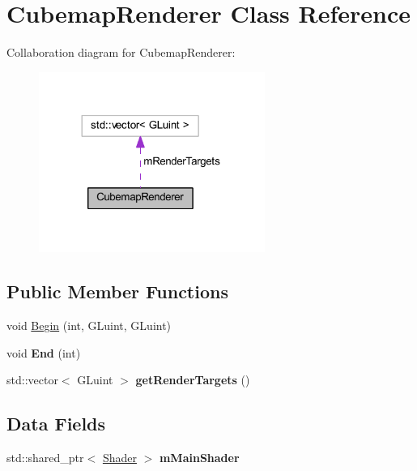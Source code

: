 \hypertarget{class_cubemap_renderer}{}\section{Cubemap\+Renderer Class Reference}
\label{class_cubemap_renderer}


Collaboration diagram for Cubemap\+Renderer\+:
\nopagebreak
\begin{figure}[H]
\begin{center}
\leavevmode
\includegraphics[width=209pt]{class_cubemap_renderer__coll__graph}
\end{center}
\end{figure}
\subsection*{Public Member Functions}
\begin{DoxyCompactItemize}
\item 
void \hyperlink{class_cubemap_renderer_aaaade77e14c75944a1dea1c809d777fb}{Begin} (int, G\+Luint, G\+Luint)
\item 
void {\bfseries End} (int)\hypertarget{class_cubemap_renderer_a9435e23f6aaab606ee0450d1909b560b}{}\label{class_cubemap_renderer_a9435e23f6aaab606ee0450d1909b560b}

\item 
std\+::vector$<$ G\+Luint $>$ {\bfseries get\+Render\+Targets} ()\hypertarget{class_cubemap_renderer_a0129da43b202da4263a6df388cf23355}{}\label{class_cubemap_renderer_a0129da43b202da4263a6df388cf23355}

\end{DoxyCompactItemize}
\subsection*{Data Fields}
\begin{DoxyCompactItemize}
\item 
std\+::shared\+\_\+ptr$<$ \hyperlink{class_shader}{Shader} $>$ {\bfseries m\+Main\+Shader}\hypertarget{class_cubemap_renderer_afdd2f628d718f612c16f2472221cc34d}{}\label{class_cubemap_renderer_afdd2f628d718f612c16f2472221cc34d}

\end{DoxyCompactItemize}
